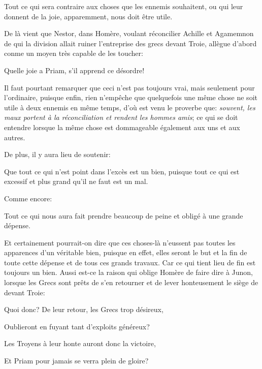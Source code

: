 \begin{emphpar}
      Tout ce qui sera contraire aux choses que les ennemis souhaitent, ou qui leur donnent de la joie, apparemment,
	  nous doit être utile.
\end{emphpar}

De là vient que Nestor, dans Homère, voulant réconcilier Achille et Agamemnon de qui la division allait ruiner
l'entreprise des grecs devant Troie, allègue d'abord conme un moyen très capable de les toucher:

\begin{emphpar}
      Quelle joie a Priam, s'il apprend ce désordre!
\end{emphpar}

Il faut pourtant remarquer que ceci n'est pas toujours vrai, mais seulement pour l'ordinaire, puisque enfin, rien
n'empêche que quelquefois une même chose ne soit utile à deux ennemis en même temps, d'où est venu le proverbe que:
\emph{souvent, les maux portent à la réconciliation et rendent les hommes amis}; ce qui se doit entendre lorsque la
même chose est dommageable également aux uns et aux autres.

\bigbreak

De plus, il y aura lieu de soutenir:

\begin{emphpar}
      Que tout ce qui n'est point dans l’excès est un bien, puisque tout ce qui est excessif et plus grand qu'il ne
	  faut est un mal.
\end{emphpar}

\bigbreak

Comme encore:

\begin{emphpar}
      Tout ce qui nous aura fait prendre beaucoup de peine et obligé à une grande dépense.
\end{emphpar}

Et certainement pourrait-on dire que ces choses-là n'eussent pas toutes les apparences d'un véritable bien, puisque en
effet, elles seront le but et la fin de toute cette dépense et de tous ces grands travaux. Car ce qui tient lieu de fin
est toujours un bien. Aussi est-ce la raison qui oblige Homère de faire dire à Junon, lorsque les Grecs sont prêts de s'en
retourner et de lever honteusement le siège de devant Troie:

\begin{emphpar}
      Quoi donc? De leur retour, les Grecs trop désireux,
	  
	  Oublieront en fuyant tant d'exploits généreux?

	  Les Troyens à leur honte auront donc la victoire,
	  
	  Et Priam pour jamais se verra plein de gloire?
\end{emphpar}

